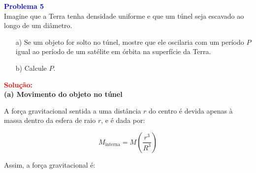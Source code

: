 \documentclass[a4paper,12pt]{article}
\begin{document}
\begin{flushleft}
\textbf{\textcolor{blue}{\Large Problema 5}}\\

Imagine que a Terra tenha densidade uniforme e que um túnel seja escavado ao longo de um diâmetro.

\begin{enumerate}
    \item[a)] Se um objeto for solto no túnel, mostre que ele oscilaria com um período \( P \) igual ao 
    período de um satélite em órbita na superfície da Terra.
    \item[b)] Calcule \( P \).
\end{enumerate}

\begin{center}
\end{center}

\textcolor{red}{\textbf{Solução:}}\\

\textbf{(a) Movimento do objeto no túnel}

A força gravitacional sentida a uma distância \( r \) do centro é devida apenas à massa dentro da esfera de raio \( r \), e é dada por:

\begin{equation}
M_{\text{interna}} = M \left( \frac{r^3}{R^3} \right)
\end{equation}

Assim, a força gravitacional é:


\end{flushleft}
\end{document}
